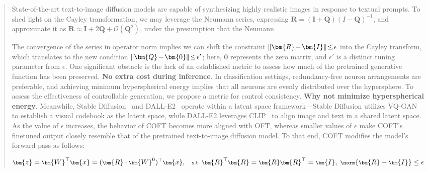 \begin{abstract}
State-of-the-art text-to-image diffusion models are capable of synthesizing highly realistic images in response to textual prompts. To shed light on the Cayley transformation, we may leverage the Neumann series, expressing $\bm{R}=(\bm{I}+\bm{Q})(I-\bm{Q})^{-1}$, and approximate it as $\bm{R}\approx\bm{I}+2\bm{Q}+\mathcal{O}(\bm{Q}^2)$, under the presumption that the Neumann

The convergence of the series in operator norm implies we can shift the constraint $\thickmuskip=2mu \medmuskip=2mu\|\bm{R}-\bm{I}\|\leq\epsilon$ into the Cayley transform, which translates to the new condition $\thickmuskip=2mu \medmuskip=2mu \|\bm{Q}-\bm{0}\|\leq\epsilon'$; here, $\bm{0}$ represents the zero matrix, and $\epsilon'$ is a distinct tuning parameter from $\epsilon$. One significant obstacle is the lack of an established metric to assess how much of the pretrained generative function has been preserved. \textbf{No extra cost during inference}. In classification settings, redundancy-free neuron arrangements are preferable, and achieving minimum hyperspherical energy implies that all neurons are evenly distributed over the hypersphere. To assess the effectiveness of controllable generation, we propose a metric for control consistency. \textbf{Why not minimize hyperspherical energy}. Meanwhile, Stable Diffusion~\cite{rombach2022high} and DALL-E2~\cite{ramesh2022hierarchical} operate within a latent space framework—Stable Diffusion utilizes VQ-GAN~\cite{esser2021taming} to establish a visual codebook as the latent space, while DALL-E2 leverages CLIP~\cite{radford2021learning} to align image and text in a shared latent space. As the value of $\epsilon$ increases, the behavior of COFT becomes more aligned with OFT, whereas smaller values of $\epsilon$ make COFT’s finetuned output closely resemble that of the pretrained text-to-image diffusion model. To that end, COFT modifies the model’s forward pass as follows:

\begin{equation}\label{eq:coft_general}
    \footnotesize
    \bm{z}=\bm{W}^\top\bm{x}=(\bm{R}\cdot\bm{W}^0)^\top\bm{x},~~~\text{s.t.}~\bm{R}^\top\bm{R}=\bm{R}\bm{R}^\top=\bm{I},~\norm{\bm{R}-\bm{I}}\leq \epsilon
\end{equation}


\end{abstract}
